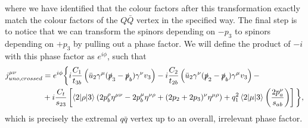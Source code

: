 where we have identified that the colour factors after this transformation exactly match the colour factors of the $Q\bar{Q}$ vertex in the specified way. The final step is to notice that we can transform the spinors depending on $-p_3$ to spinors depending on $+p_3$ by pulling out a phase factor. We will define the product of $-i$ with this phase factor as $e^{i \phi}$, such that
\begin{equation}
\begin{split}
j_{uno, crossed}^{\mu \nu} &= e^{i\phi} \bigg \{ i \frac{C_1}{t_{3b}} \left(\bar{u}_2 \gamma^\mu (\slashed{p}_3 - \slashed{p}_b)\gamma^\nu v_3 \right) - i \frac{C_2}{t_{2b}} \left(\bar{u}_2 \gamma^\nu (\slashed{p}_2 - \slashed{p}_b) \gamma^\mu v_3 \right) -  \\
& +i \frac{C_t}{s_{23}} \left[\mathinner{\langle2\vert\rho\vert3\rangle}_{} \left(2p_b^\rho \eta^{\mu \nu} - 2 p_b^\mu \eta^{\nu \rho} + (2p_2 + 2p_3)^\nu \eta^{\mu \rho} \right) + q_1^2 \mathinner{\langle2\vert\mu\vert3\rangle}_{} \left(\frac{2p_a^\nu}{s_{ab}} \right) \right] \bigg \},
\end{split}
\end{equation}
which is precisely the extremal $q\bar{q}$ vertex up to an overall, irrelevant phase factor. 